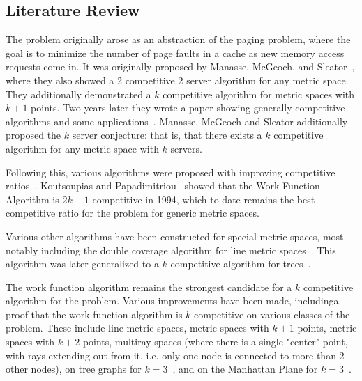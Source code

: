 \subsection{Literature Review}

The \KS problem originally arose as an abstraction of the paging problem, where the goal is to minimize the number of page faults in a cache as new memory access requests come in. It was originally proposed by Manasse, McGeoch, and Sleator~\cite{KS1988}, where they also showed a 2 competitive 2 server algorithm for any metric space. They additionally demonstrated a $k$ competitive algorithm for metric spaces with $k+1$ points. Two years later they wrote a paper showing generally competitive algorithms and some applications~\cite{KS1990}. Manasse, McGeoch and Sleator additionally proposed the $k$ server conjecture: that is, that there exists a $k$ competitive algorithm for any metric space with $k$ servers. 

Following this, various algorithms were proposed with improving competitive ratios~\cite{MP1990, harm2000}. Koutsoupias and Papadimitriou~\cite{KS1990} showed that the Work Function Algorithm is $2k-1$ competitive in 1994, which to-date remains the best competitive ratio for the \KS problem for generic metric spaces.

Various other algorithms have been constructed for special metric spaces, most notably including the double coverage algorithm for line metric spaces~\cite{new1991}. This algorithm was later generalized to a $k$ competitive algorithm for trees~\cite{tree1991}.

The work function algorithm remains the strongest candidate for a $k$ competitive algorithm for the \KS problem. Various improvements have been made, includinga proof that the work function algorithm is $k$ competitive on various classes of the problem. These include line metric spaces, metric spaces with $k+1$ points, metric spaces with $k+2$ points, multiray spaces (where there is a single "center" point, with rays extending out from it, i.e. only one node is connected to more than 2 other nodes), on tree graphs for $k=3$~\cite{unifyingPotential2021}, and on the Manhattan Plane for $k=3$~\cite{MP2002}. 

